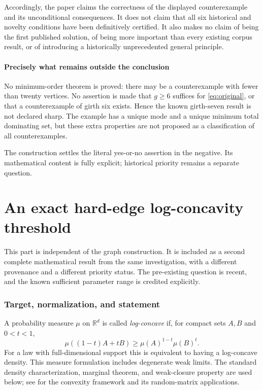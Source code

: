 \documentclass[11pt,a4paper]{article}
\theoremstyle{definition}
\theoremstyle{remark}
\begin{document}
Accordingly, the paper claims the correctness of the displayed
counterexample and its unconditional consequences. It does not
claim that all six historical and novelty conditions have been
definitively certified. It also makes no claim of being the first
published solution, of being more important than every existing
corpus result, or of introducing a historically unprecedented
general principle.

\subsection*{Precisely what remains outside the conclusion}

No minimum-order theorem is proved: there may be a counterexample
with fewer than twenty vertices. No assertion is made that
$g\ge6$ suffices for \eqref{eq:original}, or that a counterexample
of girth six exists. Hence the known girth-seven result is not
declared sharp. The example has a unique mode and a unique minimum
total dominating set, but these extra properties are not proposed
as a classification of all counterexamples.

The construction settles the literal yes-or-no assertion in the
negative. Its mathematical content is fully explicit; historical
priority remains a separate question.



\clearpage
\part{An exact hard-edge log-concavity threshold}
\label{part:hardedge}

This part is independent of the graph construction. It is included as
a second complete mathematical result from the same investigation,
with a different provenance and a different priority status.
The pre-existing question is recent, and the known sufficient
parameter range is credited explicitly.

\section{Target, normalization, and statement}


A probability measure $\mu$ on $\mathbb R^d$ is called
\emph{log-concave} if, for compact sets $A,B$ and $0<t<1$,
\[
 \mu((1-t)A+tB)\geq\mu(A)^{1-t}\mu(B)^t.
\]
For a law with full-dimensional support this is equivalent to having
a log-concave density. This measure formulation includes degenerate
weak limits. The standard density characterization, marginal theorem,
and weak-closure property are used below; see \cite{hePrekopa,heBKM}
for the convexity framework and its random-matrix applications.
\end{document}
